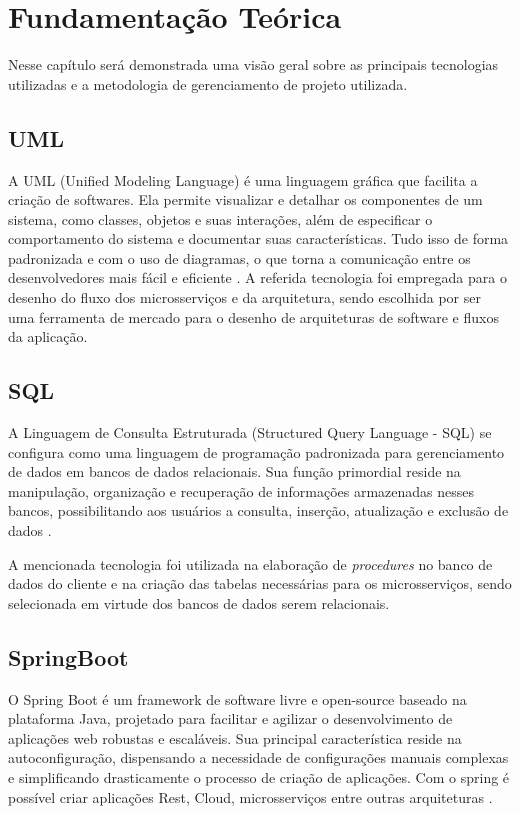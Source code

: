 \chapter{Fundamentação Teórica}
\label{cap:fundamentacao}

Nesse capítulo será demonstrada uma visão geral sobre as principais tecnologias
utilizadas e a metodologia de gerenciamento de projeto utilizada.


\section{UML}
A UML (Unified Modeling Language) é uma linguagem gráfica que facilita a criação de softwares. Ela permite visualizar e detalhar os componentes de um sistema, como classes, objetos e suas interações, além de especificar o comportamento do sistema e documentar suas características. Tudo isso de forma padronizada e com o uso de diagramas, o que torna a comunicação entre os desenvolvedores mais fácil e eficiente \cite{uml:explicacao}. 
A referida tecnologia foi empregada para o desenho do fluxo dos microsserviços e da arquitetura, sendo escolhida por ser uma ferramenta de mercado para o desenho de arquiteturas de software e fluxos da aplicação.


\section{SQL}
A Linguagem de Consulta Estruturada (Structured Query Language - SQL) se configura como uma linguagem de programação padronizada para gerenciamento de dados em bancos de dados relacionais. Sua função primordial reside na manipulação, 
organização e recuperação de informações armazenadas nesses bancos, possibilitando aos usuários a consulta, inserção, atualização e exclusão de dados \cite{sql:explicacao}.

A mencionada tecnologia foi utilizada na elaboração de \textit{procedures} no banco de dados do cliente e na criação das tabelas necessárias para os microsserviços, sendo selecionada em virtude dos bancos de dados serem relacionais.


\section{SpringBoot}
O Spring Boot é um framework de software livre e open-source baseado na plataforma Java, projetado para facilitar e agilizar o desenvolvimento de aplicações web robustas e escaláveis. Sua principal característica reside na autoconfiguração, dispensando a necessidade de configurações manuais complexas e simplificando drasticamente o processo de criação de aplicações. Com o spring é possível criar aplicações Rest, Cloud, microsserviços entre outras arquiteturas \cite{spring:explicacao}.

